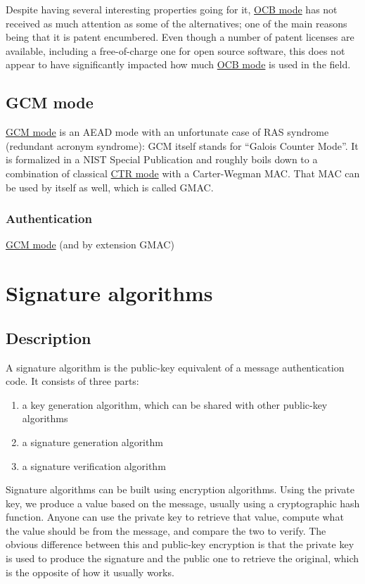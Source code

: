 \documentclass[11pt,ebook,table,dvipsnames]{memoir}
\begin{document}
Despite having several interesting properties going for it, \hyperref[OCB-mode]{OCB mode}
has not received as much attention as some of the alternatives; one of
the main reasons being that it is patent encumbered. Even though a
number of patent licenses are available\cite{ocb:license}, including a
free-of-charge one for open source software, this does not appear to
have significantly impacted how much \hyperref[OCB-mode]{OCB mode} is used in the field.
\section{\label{GCM-mode}GCM mode}
\label{sec-2-7-9}

\hyperref[GCM-mode]{GCM mode} is an \gls{AEAD mode} with an unfortunate case of RAS
syndrome (redundant acronym syndrome): GCM itself stands for \enquote{Galois
Counter Mode}. It is formalized in a NIST Special
Publication\cite{gcm} and roughly boils down to a combination of
classical \hyperref[CTR-mode]{CTR mode} with a \gls{Carter-Wegman MAC}. That MAC can be
used by itself as well, which is called \gls{GMAC}.

\subsection{Authentication}
\label{sec-2-7-9-1}

\hyperref[GCM-mode]{GCM mode} (and by extension GMAC)
\chapter{Signature algorithms}
\label{sec-2-8}
\section{Description}
\label{sec-2-8-1}

A signature algorithm is the public-key equivalent of a message
authentication code. It consists of three parts:

\begin{enumerate}
\item a key generation algorithm, which can be shared with other
public-key algorithms
\item a signature generation algorithm
\item a signature verification algorithm
\end{enumerate}

Signature algorithms can be built using encryption algorithms. Using
the private key, we produce a value based on the message, usually
using a cryptographic hash function. Anyone can use the private key to
retrieve that value, compute what the value should be from the
message, and compare the two to verify. The obvious difference between
this and \gls{public-key encryption} is that the private key is used
to produce the signature and the public one to retrieve the original,
which is the opposite of how it usually works.
\end{document}
